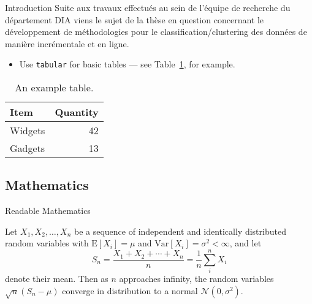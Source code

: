 \documentclass{beamer}
\begin{document}
\begin{frame}{Introduction}
	Suite aux travaux effectués au sein de l'équipe de recherche du département DIA viens le sujet de la thèse en question concernant le développement de méthodologies pour le classification/clustering des données de manière incrémentale et en ligne.

\begin{itemize}
\item Use \texttt{tabular} for basic tables --- see Table~\ref{tab:widgets}, for example.

\end{itemize}


\begin{table}
\centering
\begin{tabular}{l|r}
Item & Quantity \\\hline
Widgets & 42 \\
Gadgets & 13
\end{tabular}
\caption{\label{tab:widgets}An example table.}
\end{table}

\end{frame}

\subsection{Mathematics}

\begin{frame}{Readable Mathematics}

Let $X_1, X_2, \ldots, X_n$ be a sequence of independent and identically distributed random variables with $\text{E}[X_i] = \mu$ and $\text{Var}[X_i] = \sigma^2 < \infty$, and let
$$S_n = \frac{X_1 + X_2 + \cdots + X_n}{n}
      = \frac{1}{n}\sum_{i}^{n} X_i$$
denote their mean. Then as $n$ approaches infinity, the random variables $\sqrt{n}(S_n - \mu)$ converge in distribution to a normal $\mathcal{N}(0, \sigma^2)$.

\end{frame}
\end{document}
